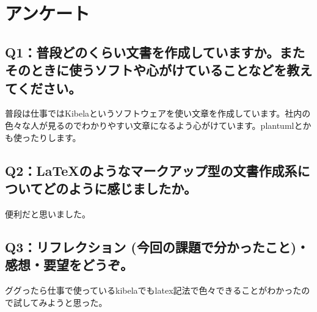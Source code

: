 \documentclass[11pt,a4j]{jarticle}
\begin{document}
\section{アンケート}

\subsection{Q1：普段どのくらい文書を作成していますか。またそのときに使うソフトや心がけていることなどを教えてください。}
普段は仕事ではKibelaというソフトウェアを使い文章を作成しています。社内の色々な人が見るのでわかりやすい文章になるよう心がけています。plantumlとかも使ったりします。

\subsection{Q2：LaTeXのようなマークアップ型の文書作成系についてどのように感じましたか。}
便利だと思いました。

\subsection{Q3：リフレクション (今回の課題で分かったこと)・感想・要望をどうぞ。}
ググったら仕事で使っているkibelaでもlatex記法で色々できることがわかったので試してみようと思った。
\end{document}
